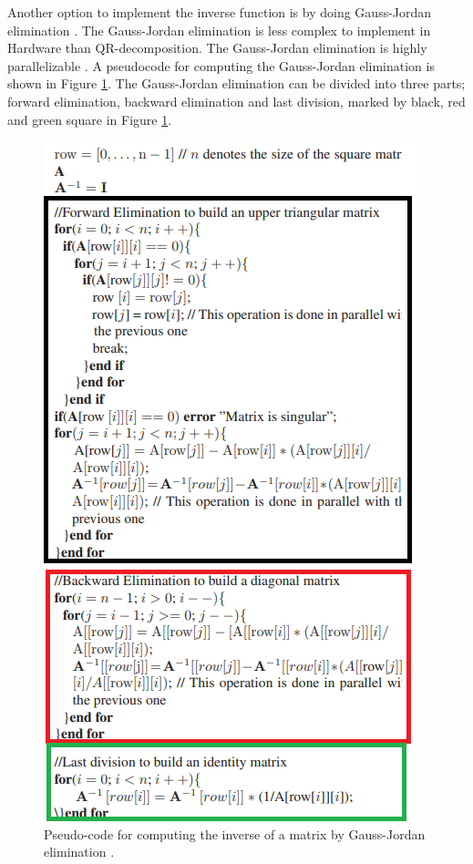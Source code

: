 Another option to implement the inverse function is by doing Gauss-Jordan elimination \cite{gauss_jordan_fpga}. The Gauss-Jordan elimination is less complex to implement in Hardware than QR-decomposition. The Gauss-Jordan elimination is highly parallelizable \cite{gauss_jordan_fpga}. A pseudocode for computing the Gauss-Jordan elimination is shown in Figure \ref{fig:gauss_jordan_pseudocode}. The Gauss-Jordan elimination can be divided into three parts; forward elimination, backward elimination and last division, marked by black, red and green square in Figure \ref{fig:gauss_jordan_pseudocode}. 
\begin{figure}[H]
\centering
   \includegraphics[scale=0.7]{images/gauss_jordan_pseudocode.png}
  \caption{ Pseudo-code for computing the inverse of a matrix by Gauss-Jordan elimination \cite{gauss_jordan_fpga}. } 
  \label{fig:gauss_jordan_pseudocode}
\end{figure}



